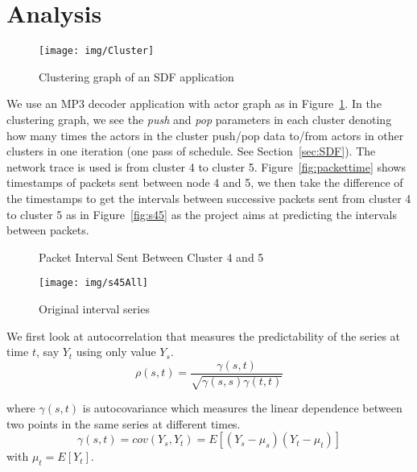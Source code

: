 \documentclass[12pt]{article}
\begin{document}
\section{Analysis}
\begin{figure}[ht!]
\centering
\texttt{[image: img/Cluster]}
\caption{Clustering graph of an SDF application}\label{fig:Cluster}
\end{figure}

We use an MP3 decoder application with actor graph as in
Figure~\ref{fig:Cluster}. In the clustering graph, we see the \textit{push} and
\textit{pop} parameters in each cluster denoting how many times the actors in
the cluster push/pop data to/from actors in other clusters in one iteration
(one pass of schedule. See Section~\ref{sec:SDF}). The network trace is used is
from cluster 4 to cluster 5. Figure~\ref{fig:packettime} shows timestamps of
packets sent between node 4 and 5, we then take the difference of the timestamps
to get the intervals between successive packets sent from cluster 4 to cluster 5
as in Figure~\ref{fig:s45} as the project aims at predicting the intervals between packets.

\begin{figure*}[ht!]
\centering
{}
\caption{Packet Interval Sent Between Cluster 4 and 5}
\end{figure*}

\begin{figure}[ht!]
\centering
\texttt{[image: img/s45All]}
\caption{Original interval series}\label{fig:s45All}
\end{figure}

We first look at autocorrelation that measures the predictability of the series
at time $t$, say $Y_t$ using only value $Y_s$.
\begin{equation}
\rho(s,t)=\frac{\gamma(s,t)}{\sqrt{\gamma(s,s)\gamma(t,t)}}
\end{equation}

where $\gamma(s,t)$ is autocovariance which measures the linear dependence
between two points in the same series at different times.
\begin{equation}
\gamma(s,t)=cov(Y_s, Y_t)=E[(Y_s-\mu_s)(Y_t-\mu_t)]
\end{equation}
with $\mu_t=E[Y_t]$.
\end{document}
